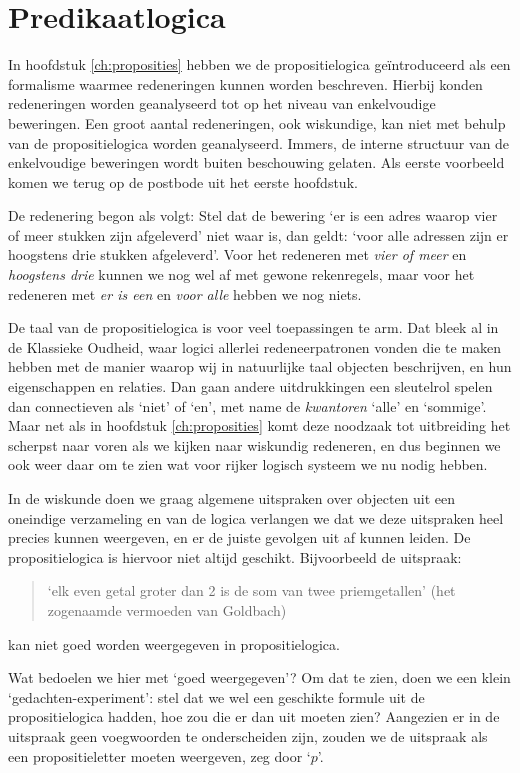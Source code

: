 \chapter{Predikaatlogica}\label{ch:predicaten}
In hoofdstuk \ref{ch:proposities} hebben we de propositielogica ge\"introduceerd als een formalisme waarmee redeneringen kunnen worden beschreven. Hierbij konden redeneringen worden geanalyseerd tot op het niveau van enkelvoudige beweringen. Een groot aantal redeneringen, ook wiskundige, kan niet met behulp van de propositielogica worden geanalyseerd. Immers, de interne structuur van de enkelvoudige beweringen wordt buiten beschouwing gelaten. Als eerste voorbeeld komen we terug op de postbode uit het eerste hoofdstuk.

De redenering begon als volgt: Stel dat de bewering `er is een adres waarop vier of meer stukken zijn afgeleverd' niet waar is, dan geldt: `voor alle adressen zijn er hoogstens drie stukken afgeleverd'. Voor het redeneren met \textit{vier of meer} en \textit{hoogstens drie} kunnen we nog wel af met gewone rekenregels, maar voor het redeneren met \textit{er is een} en \textit{voor alle} hebben we nog niets.

De taal van de propositielogica is voor veel toepassingen te arm. Dat bleek al in de Klassieke Oudheid, waar logici allerlei redeneerpatronen vonden die te maken hebben met de manier waarop wij in natuurlijke taal objecten beschrijven, en hun eigenschappen en relaties. Dan gaan andere uitdrukkingen een sleutelrol spelen dan connectieven als `niet' of `en', met name de \textit{kwantoren} `alle' en `sommige'. Maar net als in hoofdstuk \ref{ch:proposities} komt deze noodzaak tot uitbreiding het scherpst naar voren als we kijken naar wiskundig redeneren, en dus beginnen we ook weer daar om te zien wat voor rijker logisch systeem we nu nodig hebben.

In de wiskunde doen we graag algemene uitspraken over objecten uit een oneindige verzameling en van de logica verlangen we dat we deze uitspraken heel precies kunnen weergeven, en er de juiste gevolgen uit af kunnen leiden. De propositielogica is hiervoor niet altijd geschikt. Bijvoorbeeld de uitspraak:
\begin{quote}
    `elk even getal groter dan 2 is de som van twee priemgetallen' (het zogenaamde vermoeden van Goldbach)
\end{quote}
kan niet goed worden weergegeven in propositielogica.

Wat bedoelen we hier met `goed weergegeven'? Om dat te zien, doen we een klein `gedachten-experiment': stel dat we wel een geschikte formule uit de propositielogica hadden, hoe zou die er dan uit moeten zien? Aangezien er in de uitspraak geen voegwoorden te onderscheiden zijn, zouden we de uitspraak als een propositieletter moeten weergeven, zeg door `$p$'.

